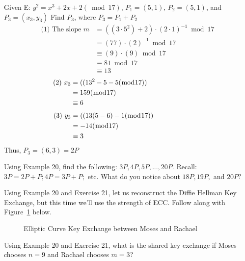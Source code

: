 \begin{eg} Given E: $y^2 = x^3 + 2x + 2 (\bmod17)$, $P_1 = (5,1)$, $P_2 = (5,1)$, and $P_3 = (x_3, y_3)$
	Find $P_3$, where $P_3 = P_1 + P_2$
		\begin{align*}
		\textrm{(1) The slope~} m
		 &= ( (3 \cdot 5^2) + 2) \cdot (2 \cdot 1)^{-1} \bmod 17\\
	          &= (77) \cdot (2)^{-1} \bmod 17\\
                     &\equiv (9) \cdot (9) \bmod 17\\
                     &\equiv 81 \bmod 17\\
                    &\equiv 13
		\end{align*}
		\begin{align*}
		\textrm{(2)~}x_3
		 &= ( (13^2 - 5 - 5  (\bmod 17)) \text{\qquad \qquad \qquad \quad \: \: }\\
	          &= 159(\bmod 17)\\
                     &\equiv 6
		\end{align*}
			\begin{align*}
		\textrm{(3)~}y_3
		 &= ( (13(5 - 6) - 1(\bmod 17)) \text{\qquad \qquad \qquad \quad }\\
	          &= -14(\bmod 17)\\
                     &\equiv 3
		\end{align*}
Thus, $P_3 = (6,3) = 2P$
\end{eg}
\begin {exer}
Using Example 20, find the following: $3P, 4P, 5P, ..., 20P.$  Recall: $3P = 2P + P;  4P = 3P +P;$ etc.  What do you notice about $18P,  19P,$ and $20P?$
\end{exer}
\begin{eg}
Using Example 20 and Exercise 21, let us reconstruct the Diffie Hellman Key Exchange, but this time we'll use the strength of ECC.  Follow along with Figure~\ref{fig:DH:DHKE_8} below.
\begin{figure}[H]
	  \caption{\label{fig:DH:DHKE_8} Elliptic Curve Key Exchange between Moses and Rachael }
\end{figure}
\end{eg}
\begin{exer}
Using Example 20 and Exercise 21, what is the shared key exchange if Moses chooses $n = 9$ and Rachael chooses $m = 3$?
\end{exer}

